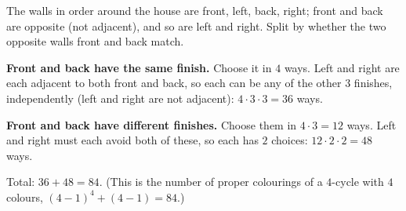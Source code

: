 The walls in order around the house are front, left, back, right; front and back are opposite (not adjacent), and so are left and right. Split by whether the two opposite walls front and back match.

\textbf{Front and back have the same finish.} Choose it in $4$ ways. Left and right are each adjacent to both front and back, so each can be any of the other $3$ finishes, independently (left and right are not adjacent): $4\cdot3\cdot3=36$ ways.

\textbf{Front and back have different finishes.} Choose them in $4\cdot3=12$ ways. Left and right must each avoid both of these, so each has $2$ choices: $12\cdot2\cdot2=48$ ways.

Total: $36+48=\boxed{84}$. (This is the number of proper colourings of a $4$-cycle with $4$ colours, $(4-1)^4+(4-1)=84$.)
